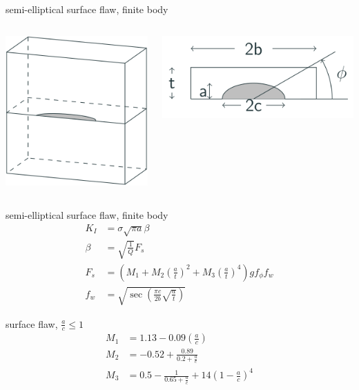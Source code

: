 \documentclass[
  letterpaper,
  ignorenonframetext,
  aspectratio=43,
  handout,
  12pt]{beamer}
\let\Oldincludegraphics\includegraphics
\renewcommand{\includegraphics}[2][]{\Oldincludegraphics[width=\textwidth,height=0.7\textheight,keepaspectratio]{#2}}
\begin{document}
\begin{frame}{semi-elliptical surface flaw, finite body}
\protect\hypertarget{semi-elliptical-surface-flaw-finite-body}{}
\begin{columns}[T]
\begin{column}{0.5\textwidth}
\includegraphics{../images/edge-flaw.svg}
\end{column}

\begin{column}{0.5\textwidth}
\includegraphics{../images/edge-flaw-plane.svg}
\end{column}
\end{columns}
\end{frame}

\begin{frame}{semi-elliptical surface flaw, finite body}
\protect\hypertarget{semi-elliptical-surface-flaw-finite-body-1}{}
\[\begin{aligned}
  K_I &= \sigma \sqrt{\pi a} \beta\\
  \beta &= \sqrt{\frac{1}{Q}} F_s\\
  F_s &= \left(M_1 + M_2 \left(\frac{a}{t}\right)^2 + M_3 \left(\frac{a}{t}\right)^4\right)g f_\phi f_w\\
  f_w &= \sqrt{\sec\left(\frac{\pi c}{2b}\sqrt{\frac{a}{t}}\right)}
\end{aligned}\]
\end{frame}

\begin{frame}{surface flaw, \(\frac{a}{c} \le 1\)}
\protect\hypertarget{surface-flaw-fracac-le-1}{}
\[\begin{aligned}
  M_1 &= 1.13 - 0.09 \left(\frac{a}{c}\right)\\
  M_2 &= -0.52 + \frac{0.89}{0.2 + \frac{a}{c}}\\
  M_3 &= 0.5 - \frac{1}{0.65 + \frac{a}{c}} + 14 \left(1-\frac{a}{c}\right)^4
\end{aligned}\]
\end{frame}
\end{document}
